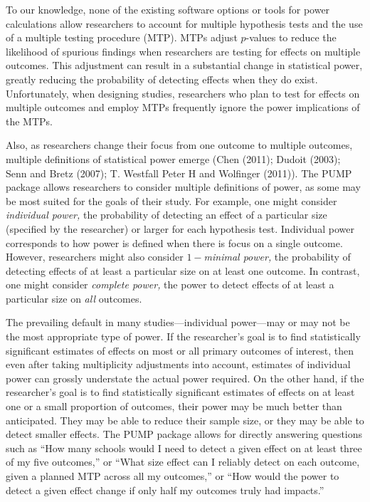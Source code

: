\documentclass[
]{article}
\begin{document}
To our knowledge, none of the existing software options or tools for
power calculations allow researchers to account for multiple hypothesis
tests and the use of a multiple testing procedure (MTP). MTPs adjust
\(p\)-values to reduce the likelihood of spurious findings when
researchers are testing for effects on multiple outcomes. This
adjustment can result in a substantial change in statistical power,
greatly reducing the probability of detecting effects when they do
exist. Unfortunately, when designing studies, researchers who plan to
test for effects on multiple outcomes and employ MTPs frequently ignore
the power implications of the MTPs.

Also, as researchers change their focus from one outcome to multiple
outcomes, multiple definitions of statistical power emerge (Chen (2011);
Dudoit (2003); Senn and Bretz (2007); T. Westfall Peter H and Wolfinger
(2011)). The PUMP package allows researchers to consider multiple
definitions of power, as some may be most suited for the goals of their
study. For example, one might consider \emph{individual power,} the
probability of detecting an effect of a particular size (specified by
the researcher) or larger for each hypothesis test. Individual power
corresponds to how power is defined when there is focus on a single
outcome. However, researchers might also consider \emph{\(1-\)minimal
power,} the probability of detecting effects of at least a particular
size on at least one outcome. In contrast, one might consider
\emph{complete power,} the power to detect effects of at least a
particular size on \emph{all} outcomes.

The prevailing default in many studies---individual power---may or may
not be the most appropriate type of power. If the researcher's goal is
to find statistically significant estimates of effects on most or all
primary outcomes of interest, then even after taking multiplicity
adjustments into account, estimates of individual power can grossly
understate the actual power required. On the other hand, if the
researcher's goal is to find statistically significant estimates of
effects on at least one or a small proportion of outcomes, their power
may be much better than anticipated. They may be able to reduce their
sample size, or they may be able to detect smaller effects. The PUMP
package allows for directly answering questions such as ``How many
schools would I need to detect a given effect on at least three of my
five outcomes,'' or ``What size effect can I reliably detect on each
outcome, given a planned MTP across all my outcomes,'' or ``How would
the power to detect a given effect change if only half my outcomes truly
had impacts.''
\end{document}
